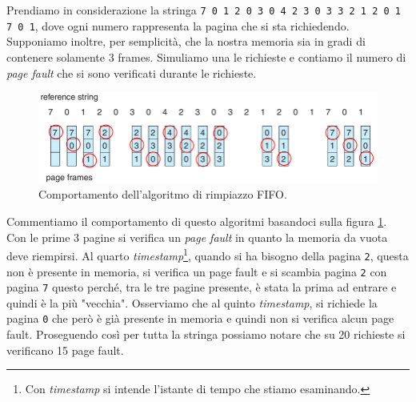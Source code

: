 Prendiamo in considerazione la stringa \texttt{\small 7 0 1 2 0 3 0 4 2 3 0 3 3 2 1 2 0 1 7 0 1}, dove ogni numero rappresenta la pagina che si sta richiedendo. Supponiamo inoltre, per semplicità, che la nostra memoria sia in gradi di contenere solamente 3 frames. Simuliamo una le richieste e contiamo il numero di \textit{page fault} che si sono verificati durante le richieste.
\begin{figure}[h]
    \centering
    \includegraphics[width = .85\textwidth]{../res/imgs/virtual memory/FIFO_replacement.png}
    \caption{Comportamento dell'algoritmo di rimpiazzo FIFO.}
    \label{fig:FIFO_replacement}
\end{figure}
Commentiamo il comportamento di questo algoritmi basandoci sulla figura \ref{fig:FIFO_replacement}. Con le prime 3 pagine si verifica un \textit{page fault} in quanto la memoria da vuota deve riempirsi. Al quarto \textit{timestamp}\footnote{Con \textit{timestamp} si intende l'istante di tempo che stiamo esaminando.}, quando si ha bisogno della pagina \texttt{2}, questa non è presente in memoria, si verifica un page fault e si scambia pagina \texttt{2} con pagina \texttt{7} questo perché, tra le tre pagine presente, è stata la prima ad entrare e quindi è la più "vecchia". Osserviamo che al quinto \textit{timestamp}, si richiede la pagina \texttt{0} che però è già presente in memoria e quindi non si verifica alcun page fault. Proseguendo così per tutta la stringa possiamo notare che su 20 richieste si verificano 15 page fault.

